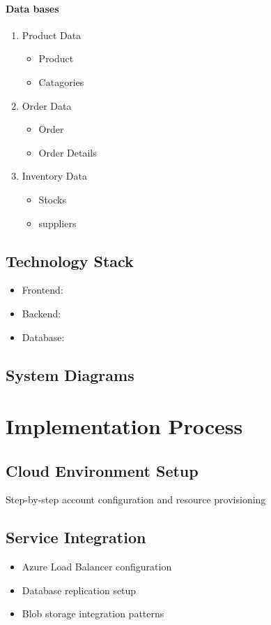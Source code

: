 \documentclass{llncs}
\begin{document}
\paragraph{Data bases}
\begin{enumerate}
    \item Product Data
    \begin{itemize}
        \item Product
        \item Catagories
        \end{itemize}
    \item Order Data
    \begin{itemize}
        \item Order 
        \item Order Details
        \end{itemize}
    \item Inventory Data
    \begin{itemize}
        \item Stocks 
        \item suppliers
        \end{itemize}
 
\end{enumerate}
\subsection{Technology Stack}
\begin{itemize}
    \item Frontend: 
    \item Backend: 
    \item Database: 

\end{itemize}

\subsection{System Diagrams}

\section{Implementation Process}
\subsection{Cloud Environment Setup}
Step-by-step account configuration and resource provisioning

\subsection{Service Integration}
\begin{itemize}
    \item Azure Load Balancer configuration
    \item Database replication setup
    \item Blob storage integration patterns
\end{itemize}
\end{document}
